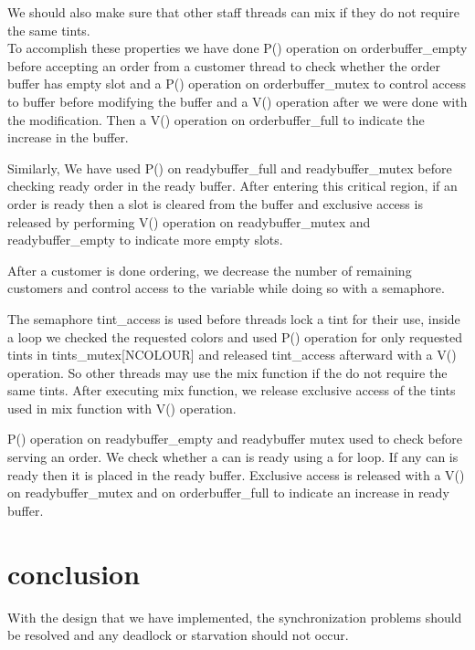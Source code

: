 \documentclass[11pt, english]{article}
\begin{document}
We should also make sure that other staff threads can mix if they do not require the same tints. \\


To accomplish these properties we have done P() operation on orderbuffer\_empty  before accepting an order from a customer thread to check whether the order buffer has empty slot and a P() operation on orderbuffer\_mutex to control access to buffer before modifying the buffer and a V() operation after we were done with the modification.  Then a V() operation on orderbuffer\_full to indicate the increase in the buffer.

Similarly, We have used P() on readybuffer\_full and readybuffer\_mutex before checking ready order in the ready buffer. After entering this critical region, if an order is ready then a slot is cleared from the buffer and exclusive access is released by performing  V() operation on readybuffer\_mutex and readybuffer\_empty to indicate more empty slots.

After a customer is done ordering, we decrease the number of remaining customers and control access to the variable while doing so with a semaphore.


The semaphore tint\_access is used before threads lock a tint for their use, inside a loop we checked the requested colors and used P() operation for only requested tints in tints\_mutex[NCOLOUR] and released tint\_access afterward with a V() operation. So other threads may use the mix function if the do not require the same tints. After executing mix function, we release exclusive access of the tints used in mix function with V() operation.


P() operation on readybuffer\_empty and readybuffer mutex used to check before serving an order. We check whether a can is ready using a for loop. If any can is ready then it is placed in the ready buffer. Exclusive access is released with a V() on readybuffer\_mutex and on orderbuffer\_full to indicate an increase in ready buffer.

\section{conclusion}
With the design that we have implemented, the synchronization problems should be resolved and any deadlock or starvation should not occur.
\end{document}
